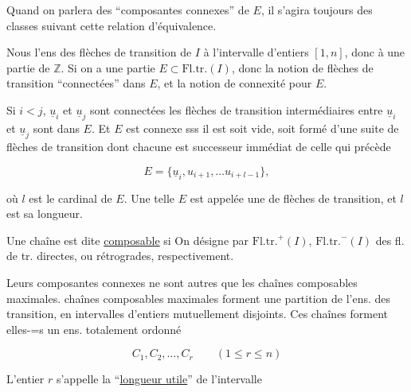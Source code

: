 
Quand on parlera des ``composantes connexes'' de $E$, il s'agira toujours des classes suivant cette relation d'équivalence.

Nous  l'ens des flèches de transition  de $I$ à l'intervalle d'entiers $[1,n]$, donc à une partie de $\mathbb{Z}$. Si on a une partie $E\subset\mathrm{Fl.tr.}(I)$,   donc  la notion de flèches de transition ``connectées'' dans $E$, et la notion de connexité pour $E$.

Si $i<j$, $\underline{u}_i$ et $\underline{u}_j$ sont connectées   les flèches de transition intermédiaires entre $\underline{u}_i$ et $\underline{u}_j$ sont dans $E$. Et $E$ est connexe sss il est soit vide, soit formé d'une suite de flèches de transition dont chacune est successeur immédiat de celle qui  précède

\[E=\{\underline{u}_i,u_{i+1},\ldots u_{i+l-1}\},\]

où $l$ est le cardinal de $E$. Une telle $E$ est appelée une \uline{} de flèches de transition, et $l$ est sa longueur.

Une chaîne est dite \uline{composable} si     On désigne par $\mathrm{Fl.tr.}^{+}(I)$, $\mathrm{Fl.tr.}^{-}(I)$   des fl. de tr. directes, ou rétrogrades, respectivement.

Leurs  composantes connexes ne sont autres que les chaînes composables maximales.    chaînes composables maximales forment une partition de l'ens. des    transition, en intervalles d'entiers mutuellement disjoints. Ces chaînes forment elles-$\mathord{=}$s un ens. totalement ordonné

\[C_1,C_2,\ldots,C_r\qquad(1\leq r\leq n)\]

L'entier $r$ s'appelle la ``\uline{longueur utile}'' de l'intervalle

